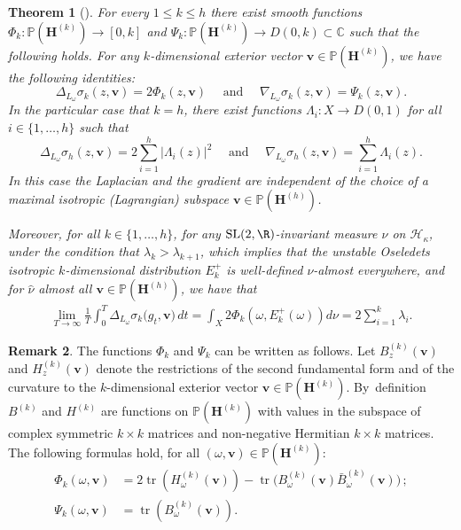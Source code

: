 \documentclass[10pt]{amsart}
\DeclareMathOperator{\tr}{tr}
\theoremstyle{plain}
\newtheorem{thm}{Theorem}[section]
\theoremstyle{definition}
\newtheorem{rem}[thm]{Remark}
\numberwithin{equation}{subsection}
\newcommand\bC{\mathbb{C}}\let\C\bC
\newcommand\bP{\mathbb{P}}
\newcommand\cH{\mathcal{H}}
\newcommand{\SL}{\mathrm{SL}}
\let\gradient\nabla
\let\laplacian\Delta
\newcommand{\bfH}{\boldsymbol{H}}
\newcommand{\bfv}{\boldsymbol{v}}
\begin{document}
\begin{thm}[\cite{For02, FMZ12}]\label{det} For every $1\leq k\leq h$
there exist smooth functions $\Phi_k:\bP(\bfH^{(k)}) \to [0,k]$ and $\Psi_k :\bP(\bfH^{(k)}) \to D(0,k) \subset \bC$ such that the following holds.
For any $k$-dimensional exterior vector $\bfv \in \bP(\bfH^{(k)})$, we have the following identities:\vspace*{-3pt}
\begin{equation}
\laplacian_{L_\omega} \sigma_k(z,\bfv) = 2\Phi_k (z, \bfv)\quad \text{ and } \quad
\gradient_{L_\omega} \sigma_k(z,\bfv) = \Psi_k (z, \bfv).\label{laplacianformula}
\end{equation}
In the particular case that $k=h$, there exist functions
$\Lambda_i: X \to D(0,1)$ for all $i\in \{1, \dots, h\}$ such that\vspace*{-3pt}
\[
\laplacian_{L_\omega} \sigma_h(z,\bfv) = 2 \sum_{i=1}^{h} |\Lambda_i(z)|^2 \quad \text{ and } \quad
\gradient_{L_\omega} \sigma_h(z,\bfv) =\sum_{i=1}^{h} \Lambda_i(z).
\]
In this case the Laplacian and the gradient are independent of the choice of a maximal isotropic (Lagrangian) subspace $\bfv\in \bP(\bfH^{(h)})$.

Moreover, for all $k\in \{1, \dots, h\}$, for any $\SL(2,\R)$-invariant measure $\nu$ on $\cH_\kappa$, under the condition that $\lambda_k > \lambda_{k+1}$, which implies that the unstable Oseledets isotropic $k$-dimensional distribution $E^+_k$ is well-defined $\nu$-almost everywhere, and for $\hat \nu$ almost all $\bfv\in \bP(\bfH^{(h)})$, we have that\vspace*{-3pt}
\begin{align*}
\lim_{T\to\infty} \frac{1}{T}\int_0^T \laplacian_{L_\omega} \sigma_k\big(g_t,\bfv\big) \, dt = \int_X 2\Phi_k
(\omega, E^+_k(\omega)) d\nu = 2\sum_{i=1}^k \lambda_i.
\end{align*}
\end{thm}
\begin{rem}
The functions $\Phi_k$ and $\Psi_k$ can be written as follows.
Let $B^{(k)}_z({\bfv})$ and $H^{(k)}_z({\bfv})$ denote the
restrictions of the second fundamental form and of the curvature to the $k$-dimensional exterior vector ${\bfv} \in \bP(\bfH^{(k)})$. By~definition $B^{(k)}$ and $H^{(k)}$ are functions on $\bP(\bfH^{(k)})$ with values in the subspace of complex symmetric $k\times k$ matrices and non-negative Hermitian $k\times k$ matrices. The following formulas hold, for all $(\omega,{\bfv})\in \bP(\bfH^{(k)})$:\vspace*{-3pt}
\begin{equation}
\label{eq:PhiPsi}
\begin{aligned}
\Phi_k (\omega, \bfv)&= 2\tr (H^{(k)}_\omega(\bfv))-
\tr \bigl(B^{(k)}_\omega(\bfv) \bar B^{(k)}_\omega (\bfv)\bigr)\,;\\
\Psi_k (\omega, \bfv)&= \tr(B^{(k)}_\omega(\bfv)).
\end{aligned}
\end{equation}
\end{rem}
\end{document}
